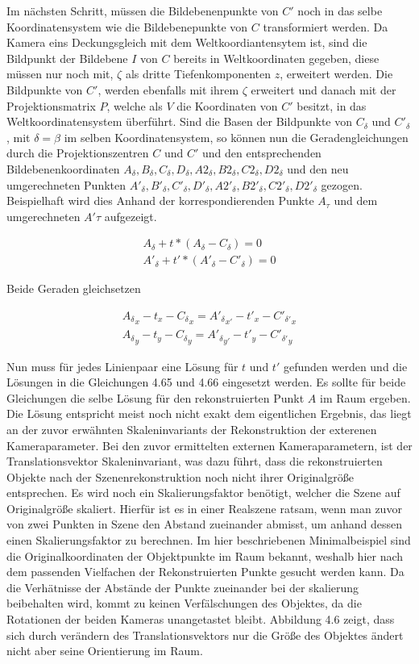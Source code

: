 Im nächsten Schritt, müssen die Bildebenenpunkte von $C'$ noch in das selbe Koordinatensystem wie die Bildebenepunkte von $C$ transformiert werden. Da Kamera eins Deckungsgleich mit dem Weltkoordiantensytem ist, sind die Bildpunkt der Bildebene $I$ von $C$ bereits in Weltkoordinaten gegeben, diese müssen nur noch mit, $\zeta$ als dritte Tiefenkomponenten $z$, erweitert werden. Die Bildpunkte von $C'$, werden ebenfalls mit ihrem $\zeta$ erweitert und danach mit der Projektionsmatrix $P$, welche als $V$ die Koordinaten von $C'$ besitzt, in das Weltkoordinatensystem überführt. 
Sind die Basen der Bildpunkte von $C_\delta$ und $C'_\delta$, mit $\delta = \beta$ im selben Koordinatensystem, so können nun die Geradengleichungen durch die Projektionszentren $C$ und $C'$ und den entsprechenden Bildebenenkoordinaten
$A_\delta,B_\delta,C_\delta,D_\delta,A2_\delta,B2_\delta,C2_\delta,D2_\delta$ und den neu umgerechneten Punkten $A'_\delta,B'_\delta,C'_\delta,D'_\delta,A2'_\delta,B2'_\delta,C2'_\delta,D2'_\delta$ gezogen. Beispielhaft wird dies Anhand der korrespondierenden Punkte $A_\tau$ und dem umgerechneten $A'\tau$ aufgezeigt.

 
\begin{gather}
	A_\delta + t*(A_\delta - C_\delta) = 0\\
	A'_\delta + t'*(A'_\delta - C'_\delta) = 0
\end{gather}

Beide Geraden gleichsetzen 

\begin{gather}
	{A_\delta}_x - t_x-{C_\delta}_x = 	{A'_\delta}_{x'} - t'_x-{C'_{\delta'}}_x \\
	{A_\delta}_y - t_y-{C_\delta}_y = 	{A'_\delta}_{y'} - t'_y-{C'_{\delta'}}_y 
\end{gather}

Nun muss für jedes Linienpaar eine Lösung für $t$ und $t'$ gefunden werden und die Lösungen in die Gleichungen 4.65 und 4.66 eingesetzt werden. Es sollte für beide Gleichungen die selbe Lösung für den rekonstruierten Punkt $A$ im Raum ergeben. Die Lösung entspricht meist noch nicht exakt dem eigentlichen Ergebnis, das liegt an der zuvor erwähnten Skaleninvariants der Rekonstruktion der exterenen Kameraparameter. Bei den zuvor ermittelten externen Kameraparametern, ist der Translationsvektor Skaleninvariant, was dazu führt, dass die rekonstruierten Objekte nach der Szenenrekonstruktion noch nicht ihrer Originalgröße entsprechen. Es wird noch ein Skalierungsfaktor benötigt, welcher die Szene auf Originalgröße skaliert. Hierfür ist es in einer Realszene ratsam, wenn man zuvor von zwei Punkten in Szene den Abstand zueinander abmisst, um anhand dessen einen Skalierungsfaktor zu berechnen. Im hier beschriebenen Minimalbeispiel sind die Originalkoordinaten der Objektpunkte im Raum bekannt, weshalb hier nach dem passenden Vielfachen der Rekonstruierten Punkte gesucht werden kann. Da die Verhätnisse der Abstände der Punkte zueinander bei der skalierung beibehalten wird, kommt zu keinen Verfälschungen des Objektes, da die Rotationen der beiden Kameras unangetastet bleibt. Abbildung 4.6 zeigt, dass sich durch verändern des Translationsvektors nur die Größe des Objektes ändert nicht aber seine Orientierung im Raum.\pagebreak

